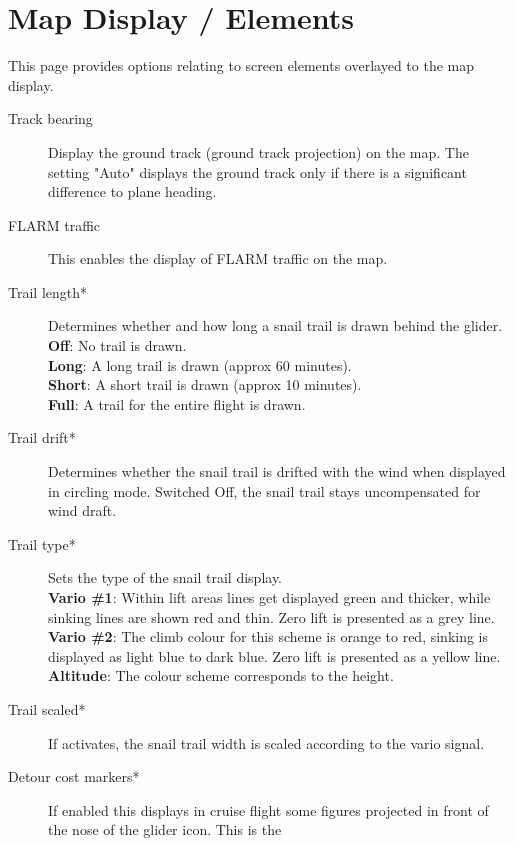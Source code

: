 \section{Map Display / Elements}\label{sec:map-elements}

This page provides options relating to screen elements overlayed to the map display.

\begin{description}
\item[Track bearing]  Display the ground track (ground track projection) on the map.
  The setting "Auto" displays the ground track only if there is a significant 
  difference to plane heading.
\item[FLARM traffic]  \label{conf:flarm-on-map} This enables the display of FLARM 
  traffic on the map.
\item[Trail length*] \label{conf:snailtrail} Determines whether and how long a
  snail trail is drawn behind the glider. \\
  {\bf Off}: No trail is drawn. \\
  {\bf Long}: A long trail is drawn (approx 60 minutes). \\
  {\bf Short}: A short trail is drawn (approx 10 minutes). \\
  {\bf Full}: A trail for the entire flight is drawn.
\item[Trail drift*] \label{conf:traildrift} Determines whether the
  snail trail is drifted with the wind when displayed in circling mode.  Switched Off,
  the snail trail stays uncompensated for wind draft.
\item[Trail type*] \label{conf:snailtype} Sets the type of the snail trail display. \\
  {\bf Vario \#1}: Within lift areas lines get displayed green and
  thicker, while sinking lines are shown red and thin.  Zero lift
  is presented as a grey line. \\
  {\bf Vario \#2}: The climb colour for this scheme is orange to red, sinking is
  displayed as light blue to dark blue. Zero lift is presented as a yellow line. \\
  {\bf Altitude}: The colour scheme corresponds to the height.
\item[Trail scaled*] \label{conf:trailscaled} If activates, the snail trail width 
  is scaled according to the vario signal.
\item[Detour cost markers*]  If enabled this displays in cruise flight some
  figures projected in front of the nose of the glider icon.  This is the

\end{description}
